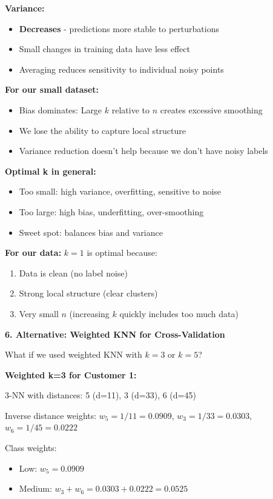 \documentclass[12pt]{article}
\begin{document}
\begin{explanation}
\textbf{Variance:}
\begin{itemize}
    \item \textbf{Decreases} - predictions more stable to perturbations
    \item Small changes in training data have less effect
    \item Averaging reduces sensitivity to individual noisy points
\end{itemize}

\textbf{For our small dataset:}
\begin{itemize}
    \item Bias dominates: Large \(k\) relative to \(n\) creates excessive smoothing
    \item We lose the ability to capture local structure
    \item Variance reduction doesn't help because we don't have noisy labels
\end{itemize}

\textbf{Optimal k in general:}
\begin{itemize}
    \item Too small: high variance, overfitting, sensitive to noise
    \item Too large: high bias, underfitting, over-smoothing
    \item Sweet spot: balances bias and variance
\end{itemize}

\textbf{For our data:} \(k=1\) is optimal because:
\begin{enumerate}
    \item Data is clean (no label noise)
    \item Strong local structure (clear clusters)
    \item Very small \(n\) (increasing \(k\) quickly includes too much data)
\end{enumerate}

\textbf{6. Alternative: Weighted KNN for Cross-Validation}

What if we used weighted KNN with \(k=3\) or \(k=5\)?

\textbf{Weighted k=3 for Customer 1:}

3-NN with distances: 5 (d=11), 3 (d=33), 6 (d=45)

Inverse distance weights: \(w_5 = 1/11 = 0.0909\), \(w_3 = 1/33 = 0.0303\), \(w_6 = 1/45 = 0.0222\)

Class weights:
\begin{itemize}
    \item Low: \(w_5 = 0.0909\)
    \item Medium: \(w_3 + w_6 = 0.0303 + 0.0222 = 0.0525\)
\end{itemize}


\end{explanation}
\end{document}
